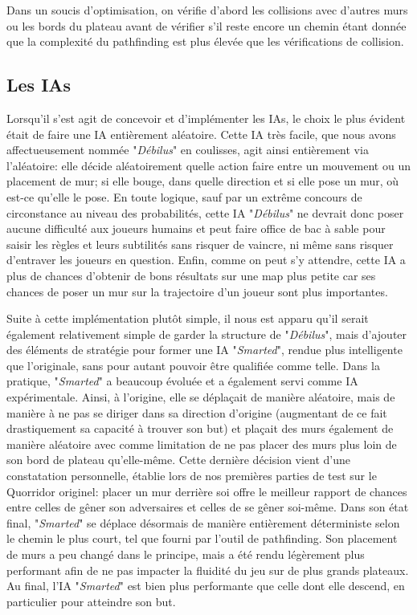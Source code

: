 \documentclass[a4paper, 12pt]{article}
\begin{document}
Dans un soucis d'optimisation, on vérifie d'abord les collisions avec d'autres murs ou les bords du plateau avant de vérifier s'il reste encore un chemin étant donnée que la complexité du pathfinding est plus élevée que les vérifications de collision.

\subsection{Les IAs}
Lorsqu'il s'est agit de concevoir et d'implémenter les IAs, le choix le plus évident était de faire une IA entièrement aléatoire. Cette IA très facile, que nous avons affectueusement nommée "\textit{Débilus}" en coulisses, agit ainsi entièrement via l'aléatoire: elle décide aléatoirement quelle action faire entre un mouvement ou un placement de mur; si elle bouge, dans quelle direction et si elle pose un mur, où est-ce qu'elle le pose.
En toute logique, sauf par un extrême concours de circonstance au niveau des probabilités, cette IA "\textit{Débilus}" ne devrait donc poser aucune difficulté aux joueurs humains et peut faire office de bac à sable pour saisir les règles et leurs subtilités sans risquer de vaincre, ni même sans risquer d'entraver les joueurs en question. Enfin, comme on peut s'y attendre, cette IA a plus de chances d'obtenir de bons résultats sur une map plus petite car ses chances de poser un mur sur la trajectoire d'un joueur sont plus importantes.

Suite à cette implémentation plutôt simple, il nous est apparu qu'il serait également relativement simple de garder la structure de "\textit{Débilus}", mais d'ajouter des éléments de stratégie pour former une IA "\textit{Smarted}", rendue plus intelligente que l'originale, sans pour autant pouvoir être qualifiée comme telle.
Dans la pratique, "\textit{Smarted}" a beaucoup évoluée et a également servi comme IA expérimentale. Ainsi, à l'origine, elle se déplaçait de manière aléatoire, mais de manière à ne pas se diriger dans sa direction d'origine (augmentant de ce fait drastiquement sa capacité à trouver son but) et plaçait des murs également de manière aléatoire avec comme limitation de ne pas placer des murs plus loin de son bord de plateau qu'elle-même.
Cette dernière décision vient d'une constatation personnelle, établie lors de nos premières parties de test sur le Quorridor originel: placer un mur derrière soi offre le meilleur rapport de chances entre celles de gêner son adversaires et celles de se gêner soi-même.
Dans son état final, "\textit{Smarted}" se déplace désormais de manière entièrement déterministe selon le chemin le plus court, tel que fourni par l'outil de pathfinding. Son placement de murs a peu changé dans le principe, mais a été rendu légèrement plus performant afin de ne pas impacter la fluidité du jeu sur de plus grands plateaux. Au final, l'IA "\textit{Smarted}" est bien plus performante que celle dont elle descend, en particulier pour atteindre son but.
\end{document}
